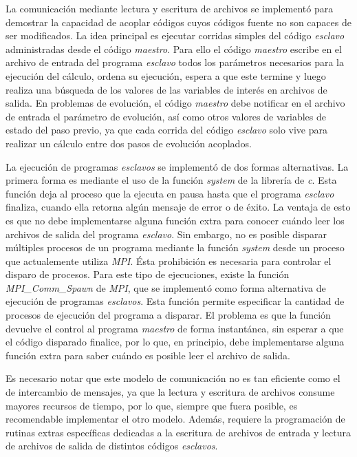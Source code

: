 La comunicación mediante lectura y escritura de archivos se implementó para demostrar la capacidad de acoplar códigos cuyos códigos fuente no son capaces de ser modificados.
La idea principal es ejecutar corridas simples del código \textit{esclavo} administradas desde el código \textit{maestro}.
Para ello el código \textit{maestro} escribe en el archivo de entrada del programa \textit{esclavo} todos los parámetros necesarios para la ejecución del cálculo,
ordena su ejecución, espera a que este termine y luego realiza una búsqueda de los valores de las variables de interés en archivos de salida.
En problemas de evolución, el código \textit{maestro} debe notificar en el archivo de entrada el parámetro de evolución,
así como otros valores de variables de estado del paso previo,
ya que cada corrida del código \textit{esclavo} solo vive para realizar un cálculo entre dos pasos de evolución acoplados.

La ejecución de programas \textit{esclavos} se implementó de dos formas alternativas.
La primera forma es mediante el uso de la función \textit{system} de la librería de \textit{c}.
Esta función deja al proceso que la ejecuta en pausa hasta que el programa \textit{esclavo} finaliza, cuando ella retorna algún mensaje de error o de éxito.
La ventaja de esto es que no debe implementarse alguna función extra para conocer cuándo leer los archivos de salida del programa \textit{esclavo}.
Sin embargo, no es posible disparar múltiples procesos de un programa mediante la función \textit{system} desde un proceso que actualemente utiliza \textit{MPI}.
Ésta prohibición es necesaria para controlar el disparo de procesos.
Para este tipo de ejecuciones, existe la función \textit{MPI\_Comm\_Spawn} de \textit{MPI}, que se implementó como forma alternativa de ejecución de programas \textit{esclavos}.
Esta función permite especificar la cantidad de procesos de ejecución del programa a disparar.
El problema es que la función devuelve el control al programa \textit{maestro} de forma instantánea, sin esperar a que el código disparado finalice,
por lo que, en principio, debe implementarse alguna función extra para saber cuándo es posible leer el archivo de salida.

Es necesario notar que este modelo de comunicación no es tan eficiente como el de intercambio de mensajes,
ya que la lectura y escritura de archivos consume mayores recursos de tiempo, por lo que, siempre que fuera posible, es recomendable implementar el otro modelo.
Además, requiere la programación de rutinas extras específicas dedicadas a la escritura de archivos de entrada y lectura de archivos de salida de distintos códigos \textit{esclavos}.

